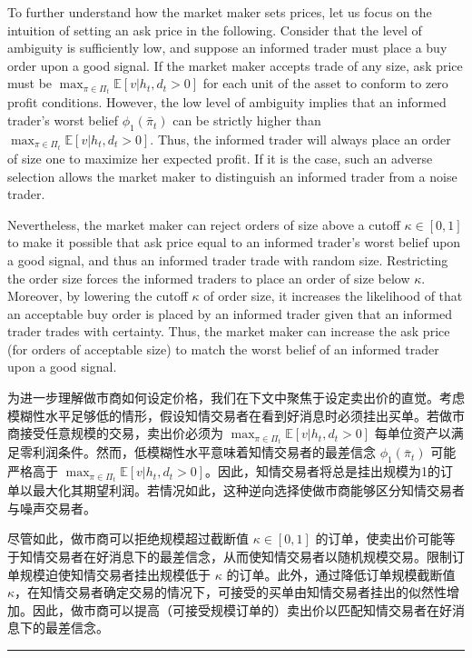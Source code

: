 \documentclass[12pt,a4paper]{article}
\newenvironment{original}{%
  \par\vspace{4pt}\noindent%
  \color{black}%
  \ignorespaces
}{%
  \par\vspace{2pt}%
}
\newenvironment{translation}{%
  \par\vspace{2pt}\noindent%
  \color{transblue}%
  \ignorespaces
}{%
  \par\vspace{4pt}\hrule\vspace{6pt}%
}
\begin{document}
\begin{original}
To further understand how the market maker sets prices, let us focus on the intuition of setting an ask price in the following. Consider that the level of ambiguity is sufficiently low, and suppose an informed trader must place a buy order upon a good signal. If the market maker accepts trade of any size, ask price must be $\max_{\pi\in\Pi_t} \mathbb{E}[v|h_t, d_t > 0]$ for each unit of the asset to conform to zero profit conditions. However, the low level of ambiguity implies that an informed trader's worst belief $\phi_1(\bar{\pi}_t)$ can be strictly higher than $\max_{\pi\in\Pi_t} \mathbb{E}[v|h_t, d_t > 0]$. Thus, the informed trader will always place an order of size one to maximize her expected profit. If it is the case, such an adverse selection allows the market maker to distinguish an informed trader from a noise trader.

Nevertheless, the market maker can reject orders of size above a cutoff $\kappa \in [0, 1]$ to make it possible that ask price equal to an informed trader's worst belief upon a good signal, and thus an informed trader trade with random size. Restricting the order size forces the informed traders to place an order of size below $\kappa$. Moreover, by lowering the cutoff $\kappa$ of order size, it increases the likelihood of that an acceptable buy order is placed by an informed trader given that an informed trader trades with certainty. Thus, the market maker can increase the ask price (for orders of acceptable size) to match the worst belief of an informed trader upon a good signal.
\end{original}
\begin{translation}
为进一步理解做市商如何设定价格，我们在下文中聚焦于设定卖出价的直觉。考虑模糊性水平足够低的情形，假设知情交易者在看到好消息时必须挂出买单。若做市商接受任意规模的交易，卖出价必须为 $\max_{\pi\in\Pi_t} \mathbb{E}[v|h_t, d_t > 0]$ 每单位资产以满足零利润条件。然而，低模糊性水平意味着知情交易者的最差信念 $\phi_1(\bar{\pi}_t)$ 可能严格高于 $\max_{\pi\in\Pi_t} \mathbb{E}[v|h_t, d_t > 0]$。因此，知情交易者将总是挂出规模为1的订单以最大化其期望利润。若情况如此，这种逆向选择使做市商能够区分知情交易者与噪声交易者。

尽管如此，做市商可以拒绝规模超过截断值 $\kappa \in [0, 1]$ 的订单，使卖出价可能等于知情交易者在好消息下的最差信念，从而使知情交易者以随机规模交易。限制订单规模迫使知情交易者挂出规模低于 $\kappa$ 的订单。此外，通过降低订单规模截断值 $\kappa$，在知情交易者确定交易的情况下，可接受的买单由知情交易者挂出的似然性增加。因此，做市商可以提高（可接受规模订单的）卖出价以匹配知情交易者在好消息下的最差信念。
\end{translation}
\end{document}
